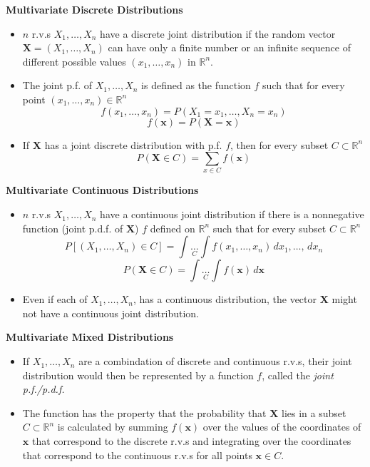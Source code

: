 \documentclass[11pt]{article}
\begin{document}
\textbf{Multivariate Discrete Distributions}
\begin{itemize}
    \item $n$ r.v.s $X_1, \ldots, X_n$ have a discrete joint distribution if the random vector 
    $\boldsymbol{X}=(X_1, \ldots, X_n)$ can have only a finite number or an infinite sequence
    of different possible values $(x_1, \ldots, x_n)$ in $\mathbb{R}^n$.
    \item The joint p.f. of $X_1, \ldots, X_n$ is defined as the function $f$ such that for 
    every point $(x_1, \ldots, x_n) \in \mathbb{R}^n$
    \[f(x_1, \ldots, x_n) = P(X_1=x_1, \ldots, X_n=x_n)\]
    \[f(\boldsymbol{x}) = P(\boldsymbol{X}=\boldsymbol{x})\]
    \item If $\boldsymbol{X}$ has a joint discrete distribution with p.f. $f$, then for every 
    subset $C \subset \mathbb{R}^n$
    \[P(\boldsymbol{X} \in C) = \sum_{x \in C} f(\boldsymbol{x})\]
\end{itemize}

\textbf{Multivariate Continuous Distributions}
\begin{itemize}
    \item $n$ r.v.s $X_1, \ldots, X_n$ have a continuous joint distribution if there is a 
    nonnegative function (joint p.d.f. of $\boldsymbol{X}$) $f$ defined on $\mathbb{R}^n$ such 
    that for every subset $C \subset 
    \mathbb{R}^n$
    \[P[(X_1, \ldots, X_n) \in C] = \int \underset{C}{\ldots} \int f(x_1, \ldots, x_n) \,dx_1, 
    \ldots, \,dx_n \]
    \[P(\boldsymbol{X} \in C) = \int \underset{C}{\ldots} \int f(\boldsymbol{x}) \,d
    \boldsymbol{x} \]
    \item Even if each of \(X_1, \ldots, X_n\), has a continuous distribution, the vector 
    \(\boldsymbol{X}\) might not have a continuous joint distribution.
\end{itemize}

\textbf{Multivariate Mixed Distributions}
\begin{itemize}
    \item If $X_1, \ldots, X_n$ are a combindation of discrete and continuous r.v.s, their 
    joint distribution would then be represented by a function $f$, called the \textit{joint
    p.f./p.d.f.}
    \item The function has the property that the probability that $\boldsymbol{X}$ lies in a 
    subset $C \subset \mathbb{R}^n$ is calculated by summing $f(\boldsymbol{x})$ over the 
    values of the coordinates of $\boldsymbol{x}$ that correspond to the discrete r.v.s and 
    integrating over the coordinates that correspond to the continuous r.v.s for all points 
    \(\boldsymbol{x} \in C\).
\end{itemize}
\end{document}

